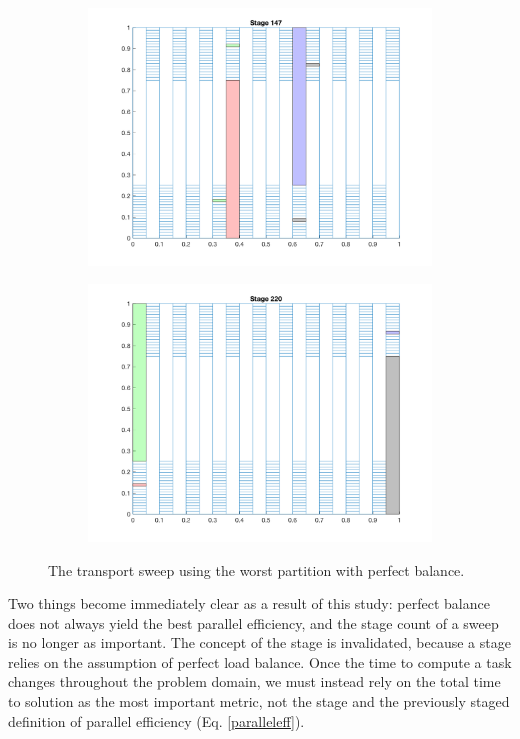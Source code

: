 \documentclass[11pt, letterpaper,titlepage,oneside]{article}
\begin{document}
\begin{figure}[H]
\begin{subfigure}{0.49\textwidth}
  \includegraphics[scale=0.5]{../figures/worst_partition_3.png}
  \end{subfigure}
  \begin{subfigure}{0.49\textwidth}
  \includegraphics[scale=0.5]{../figures/worst_partition_4.png}
  \end{subfigure}
  \caption{The transport sweep using the worst partition with perfect balance.}
  \label{worst_partition}
\end{figure}

Two things become immediately clear as a result of this study: perfect balance does not always yield the best parallel efficiency, and the stage count of a sweep is no longer as important. The concept of the stage is invalidated, because a stage relies on the assumption of perfect load balance. Once the time to compute a task changes throughout the problem domain, we must instead rely on the total time to solution as the most important metric, not the stage and the previously staged definition of parallel efficiency (Eq. \ref{paralleleff}). 
\end{document}
